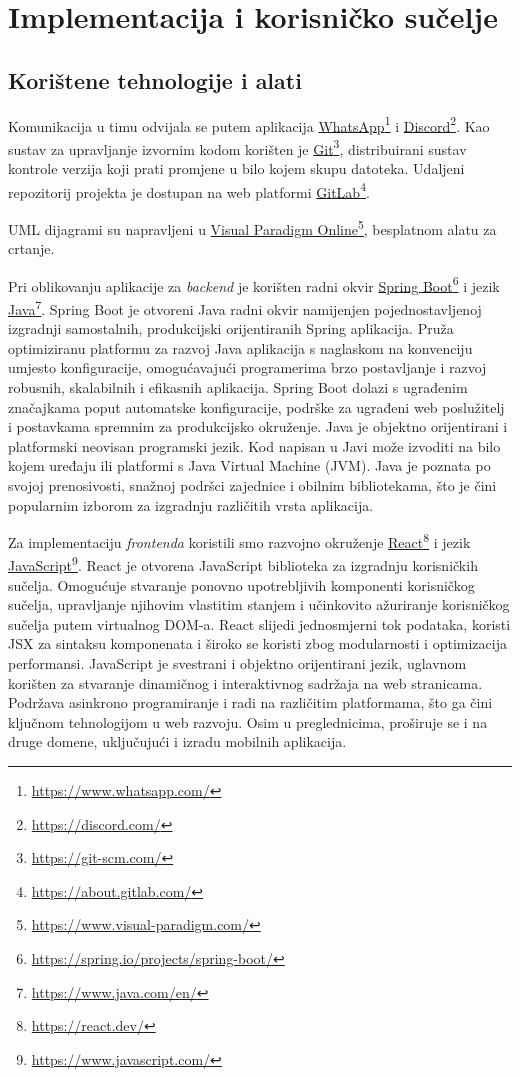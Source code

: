 \chapter{Implementacija i korisničko sučelje}


\section{Korištene tehnologije i alati}


\hspace{0.67cm}Komunikacija u timu odvijala se putem aplikacija \underline{WhatsApp}\footnote{\url{https://www.whatsapp.com/}} i \underline{Discord}\footnote{\url{https://discord.com/}}.
Kao sustav za upravljanje izvornim kodom korišten je \underline{Git}\footnote{\url{https://git-scm.com/}}, distribuirani sustav kontrole verzija koji prati promjene u bilo kojem skupu datoteka. Udaljeni repozitorij projekta je dostupan na web platformi \underline{GitLab}\footnote{\url{https://about.gitlab.com/}}.

UML dijagrami su napravljeni u \underline{Visual Paradigm Online}\footnote{\url{https://www.visual-paradigm.com/}}, besplatnom alatu za crtanje.

Pri oblikovanju aplikacije za \textit{backend}  je korišten radni okvir \underline{Spring Boot}\footnote{\url{https://spring.io/projects/spring-boot/}} i jezik \underline{Java}\footnote{\url{https://www.java.com/en/}}. Spring Boot je otvoreni Java radni okvir namijenjen pojednostavljenoj izgradnji samostalnih, produkcijski orijentiranih Spring aplikacija. Pruža optimiziranu platformu za razvoj Java aplikacija s naglaskom na konvenciju umjesto konfiguracije, omogućavajući programerima brzo postavljanje i razvoj robusnih, skalabilnih i efikasnih aplikacija. Spring Boot dolazi s ugrađenim značajkama poput automatske konfiguracije, podrške za ugrađeni web poslužitelj i postavkama spremnim za produkcijsko okruženje. Java je objektno orijentirani i platformski neovisan programski jezik. Kod napisan u Javi može izvoditi na bilo kojem uređaju ili platformi s Java Virtual Machine (JVM). Java je poznata po svojoj prenosivosti, snažnoj podršci zajednice i obilnim bibliotekama, što je čini popularnim izborom za izgradnju različitih vrsta aplikacija.




Za implementaciju \textit{frontenda} koristili smo razvojno okruženje \underline{React}\footnote{\url{https://react.dev/}} i jezik \underline{JavaScript}\footnote{\url{https://www.javascript.com/}}. React je otvorena JavaScript biblioteka za izgradnju korisničkih sučelja. Omogućuje stvaranje ponovno upotrebljivih komponenti korisničkog sučelja, upravljanje njihovim vlastitim stanjem i učinkovito ažuriranje korisničkog sučelja putem virtualnog DOM-a. React slijedi jednosmjerni tok podataka, koristi JSX za sintaksu komponenata i široko se koristi zbog modularnosti i optimizacija performansi.
JavaScript je svestrani i objektno orijentirani jezik, uglavnom korišten za stvaranje dinamičnog i interaktivnog sadržaja na web stranicama. Podržava asinkrono programiranje i radi na različitim platformama, što ga čini ključnom tehnologijom u web razvoju. Osim u preglednicima, proširuje se i na druge domene, uključujući i izradu mobilnih aplikacija. 

